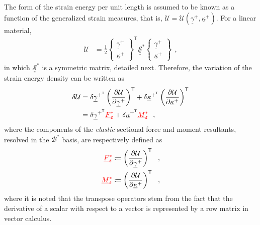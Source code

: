 \documentclass[12pt,a4paper,oneside,english]{abntex2} %
\newcommand{\fix}[1]{{\color{red}#1}}
\newcommand{\vect}[1]{\underline{#1}}
\newcommand{\del}[2]{\frac{\partial#1}{\partial#2}}
\def\tens#1{\underline{\underline{#1}}}
\def\lp{\left(}
\def\rp{\right)}
\def\T{\mathsf{T}}
\def\B*{\mathcal{B}^*}
\def\gam{\vect{\gamma}}
\def\gamp{\gam^{+}}
\def\gampT{\gam^{+^\T}}
\def\kap{\vect{\kappa}}
\def\kapp{\kap^{+}}
\def\kappT{\kap^{+^\T}}
\def\F{\vect{F}}
\def\M{\vect{M}}
\def\Stiff{\mathcal{\tens{S}}^*}
\def\Fseps{\F^*_{\varepsilon}}
\def\Mseps{\M^*_{\varepsilon}}
\begin{document}
The form of the strain energy per unit length is assumed to be known as a function of the generalized strain measures, that is, $\mathcal{U} = \mathcal{U}\lp\gamp,\kapp\rp$. \fix{For a linear material,
\begin{align}
    \mathcal{U} &= \frac{1}{2} 
    \begin{Bmatrix}
    \gamp \\ \kapp
    \end{Bmatrix}^\T 
    \Stiff 
    \begin{Bmatrix}
    \gamp \\ \kapp
    \end{Bmatrix} \ \ ,
\end{align}
in which $\Stiff$ is a symmetric matrix, detailed next.} Therefore, \fix{the variation of the strain energy density} can be written as
\begin{align}
    \delta\mathcal{U} &= \delta\gampT\lp\del{\mathcal{U}}{\gamp}\rp^\T + \delta\kappT\lp\del{\mathcal{U}}{\kapp}\rp^\T \nonumber 
    \\
    &= \delta\gampT\fix{\Fseps} + \delta\kappT\fix{\Mseps} \ \ ,
    \label{eq:delU_el}
\end{align}
where the components of the \fix{\textit{elastic}} sectional force and moment resultants, resolved in the $\B*$ basis, are respectively defined as
\begin{align}
    \fix{\Fseps} &\coloneqq \lp\del{\mathcal{U}}{\gamp}\rp^\T \ \ , \label{eq:force_res} 
    \\
    \fix{\Mseps} & \coloneqq \lp\del{\mathcal{U}}{\kapp}\rp^\T \ \ ,
    \label{eq:mom_res}
\end{align}
where it is noted that the transpose operators stem from the fact that the derivative of a scalar with respect to a vector is represented by a row matrix in vector calculus.
\end{document}
